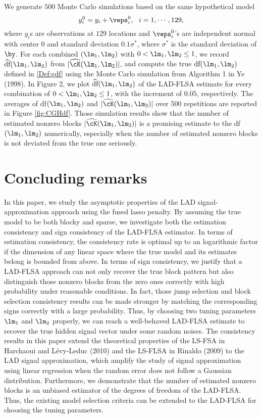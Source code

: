\documentclass[12pt]{article}
\begin{document}
We generate $500$ Monte Carlo simulations based on the
same hypothetical model
$$y_i^0=y_i+\veps^0_i,
~~i=1, \cdots, 129,$$ where $y_i$s are observations at $129$ locations and
 $\veps^0_i$'s are independent normal
 with center $0$ and  standard deviation $0.1\sigma^*$, where
$\sigma^*$ is the standard deviation of $\by$.
For each combined $(\lm_1,
\lm_2)$ with $0<\lm_1,\lm_2\le 1$, we record
$\widehat{\mbox{df}}(\lm_1,\lm_2)$ from $|\widehat{\cK}(\lm_1,\lm_2)|$,
and  compute the true
$\mbox{df}(\lm_1,\lm_2)$
defined in \eqref{Def:gdf} using the Monte Carlo simulation from Algorithm 1 in Ye
(1998). In Figure 2, we
plot
$\widehat{\mbox{df}}(\lm_1,\lm_2)$ of the LAD-FLSA estimate
 for  every combination of $0<\lm_1,\lm_2\le 1$,
 with the increment of $0.05$, respectively.
The averages of df$(\lm_1,\lm_2)$ and
$|\widehat \cK(\lm_1,\lm_2)|$ over 500 repetitions are reported
  in Figure
\ref{fig:CGHdf}. Those simulation results show that
the number of estimated nonzero blocks $|\widehat \cK(\lm_1,\lm_2)|$ is a promising estimate to
the df$(\lm_1,\lm_2)$ numerically, especially when the
number of estimated nonzero blocks is not  deviated from the true one seriously.

\section{Concluding remarks}

In this paper, we study the asymptotic properties of the LAD signal-approximation approach
using the fused lasso penalty.
By assuming the true model to be both blocky and sparse,
we investigate both the estimation consistency and sign consistency  of the LAD-FLSA  estimator.
In terms of estimation consistency, the consistency rate
is optimal up to an logarithmic factor  if the dimension of any linear space where the true model and its estimates belong is bounded from above.
In terms of sign consistency,  we justify that
a LAD-FLSA approach can not only recover the true block pattern
but also distinguish those nonzero blocks from the zero ones
 correctly with high probability under reasonable conditions.
In fact, those jump selection and block selection consistency
results can be made stronger by matching the
corresponding signs correctly with a large probability.
Thus, by choosing two tuning
parameters $\lm_1$ and $\lm_2$ properly, we can reach a well-behaved
LAD-FLSA estimate to recover the true hidden signal vector under some random noises.
The consistency results in this paper extend
 the theoretical properties of the LS-FSA in  Harchaoui and L\'{e}vy-Leduc (2010) and
  the LS-FLSA in Rinaldo (2009) to the LAD signal approximation, which
 amplify the study of signal approximation using
linear regression when the random error does not
follow a Gaussian distribution. Furthermore,
we demonstrate that the number of estimated nonzero blocks
is an unbiased estimator of the degrees of freedom
 of the LAD-FLSA.
Thus, the existing  model selection criteria
can be extended to the LAD-FLSA for choosing the tuning parameters.
\end{document}
